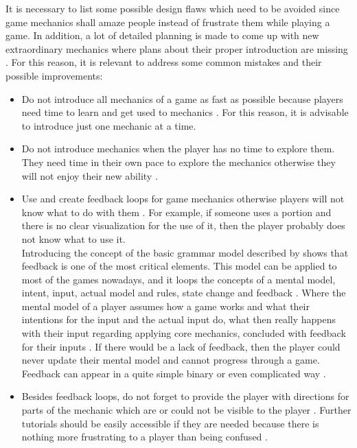 \documentclass[MGS,Master,english]{twbook}%
\begin{document}
It is necessary to list some possible design flaws which need to be avoided since game mechanics shall amaze people instead of frustrate them while playing a game. In addition, a lot of detailed planning is made to come up with new extraordinary mechanics where plans about their proper introduction are missing \cite{mechanic::gamasutra::MaxPears}. For this reason, it is relevant to address some common mistakes and their possible improvements:
\begin{itemize}
	\item Do not introduce all mechanics of a game as fast as possible because players need time to learn and get used to mechanics \cite{mechanic::gamasutra::MaxPears}. For this reason, it is advisable to introduce just one mechanic at a time. 
	\item Do not introduce mechanics when the player has no time to explore them. They need time in their own pace to explore the mechanics otherwise they will not enjoy their new ability \cite{mechanic::gamasutra::MaxPears}. 
	\item Use and create feedback loops for game mechanics otherwise players will not know what to do with them \cite{gameDesign::gameMechanicsAdvancedGameDesign}. For example, if someone uses a portion and there is no clear visualization for the use of it, then the player probably does not know what to use it. \\
	Introducing the concept of the basic grammar model described by \citep{mechanic::BasicGrammarModel} shows that feedback is one of the most critical elements. This model can be applied to most of the games nowadays, and it loops the concepts of a mental model, intent, input, actual model and rules, state change and feedback \cite{mechanic::BasicGrammarModel}. Where the mental model of a player assumes how a game works and what their intentions for the input and the actual input do, what then really happens with their input regarding applying core mechanics, concluded with feedback for their inputs \cite{mechanic::BasicGrammarModel}. If there would be a lack of feedback, then the player could never update their mental model and cannot progress through a game. Feedback can appear in a quite simple binary or even complicated way \cite{mechanic::BasicGrammarModel}.
	\item Besides feedback loops, do not forget to provide the player with directions for parts of the mechanic which are or could not be visible to the player \cite{mechanic::gamasutra::MaxPears}. Further tutorials should be easily accessible if they are needed because there is nothing more frustrating to a player than being confused \cite{mechanic::gamasutra::DanielDoan}.

\end{itemize}
\end{document}
